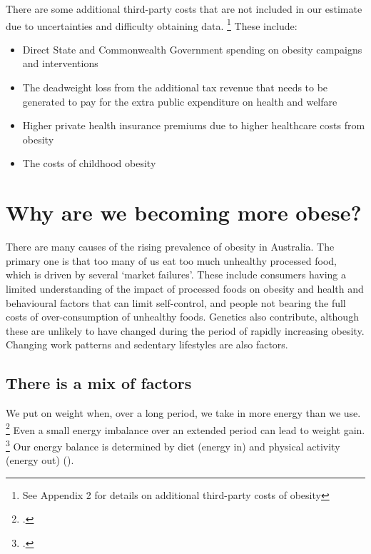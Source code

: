 \documentclass[embargoed]{grattan}
\begin{document}
There are some additional third-party costs that are not included in our estimate due to uncertainties and difficulty obtaining data.%
\footnote{See Appendix 2 for details on additional third-party costs of obesity} These include:

\begin{itemize}
\item
  Direct State and Commonwealth Government spending on obesity campaigns and interventions
\item
  The deadweight loss from the additional tax revenue that needs to be generated to pay for the extra public expenditure on health and welfare
\item
  Higher private health insurance premiums due to higher healthcare costs from obesity
\item
  The costs of childhood obesity
\end{itemize}

\chapter{Why are we becoming more obese?}\label{why-are-we-becoming-more-obese}

There are many causes of the rising prevalence of obesity in Australia.
The primary one is that too many of us eat too much unhealthy processed food, which is driven by several `market failures'.
These include consumers having a limited understanding of the impact of processed foods on obesity and health and behavioural factors that can limit self-control, and people not bearing the full costs of over-consumption of unhealthy foods.
Genetics also contribute, although these are unlikely to have changed during the period of rapidly increasing obesity.
Changing work patterns and sedentary lifestyles are also factors.

\section{There is a mix of factors}\label{there-is-a-mix-of-factors}

We put on weight when, over a long period, we take in more energy than we use.%
\footcites{Organization2016ObesityoverweightFact}{Organisation2000Obesitypreventingmanaging}{Ebbeling2002Childhoodobesitypublic}{Swinburn2004Dietnutritionprevention}{Cutler2003WhyhaveAmericans}{Roberto2015Patchyprogressobesity} Even a small energy imbalance over an extended period can lead to weight gain.%
\footcites{Ebbeling2002Childhoodobesitypublic}{Cutler2003WhyhaveAmericans} Our energy balance is determined by diet (energy in) and physical activity (energy out) ().
\end{document}
